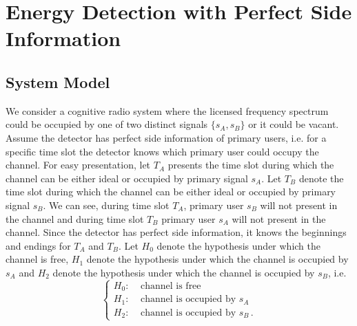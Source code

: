\section{Energy Detection with Perfect Side Information}
\subsection{System Model}
We consider a cognitive radio system where the licensed frequency spectrum could be occupied by one of two distinct signals $\{s_A, s_B\}$ or it could be vacant. 
Assume the detector has perfect side information of primary users, i.e. for a specific time slot the detector knows which primary user could occupy the channel. For easy presentation, let $T_A$ presents the time slot during which the channel can be either ideal or occupied by primary signal $s_A$. Let $T_B$ denote the time slot during which the channel can be either ideal or occupied by primary signal $s_B$. We can see, during time slot $T_A$, primary user $s_B$ will not present in the channel and during time slot $T_B$ primary user $s_A$ will not present in the channel. Since the detector has perfect side information, it knows the beginnings and endings for $T_A$ and $T_B$. Let $H_0$ denote the hypothesis under which the channel is free,  $H_1$ denote the hypothesis under which the channel is occupied by $s_A$ and $H_2$ denote the hypothesis under which the channel is occupied by $s_B$, i.e.
\begin{equation}
\begin{cases}
H_0:\;\;\;\;\text{channel is free}\\
H_1:\;\;\;\;\text{channel is occupied by $s_A$}\\
H_2:\;\;\;\;\text{channel is occupied by $s_B$}\,.
\end{cases}
\end{equation} 

